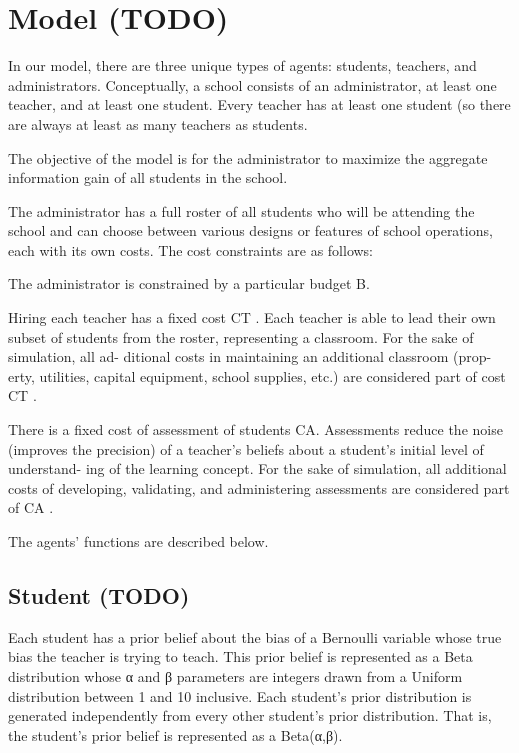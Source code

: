 \documentclass[10pt, letterpaper]{article}
\begin{document}
\section{Model (TODO)}\label{model-todo}

In our model, there are three unique types of agents: students,
teachers, and administrators. Conceptually, a school consists of an
administrator, at least one teacher, and at least one student. Every
teacher has at least one student (so there are always at least as many
teachers as students.

The objective of the model is for the administrator to maximize the
aggregate information gain of all students in the school.

The administrator has a full roster of all students who will be
attending the school and can choose between various designs or features
of school operations, each with its own costs. The cost constraints are
as follows:

The administrator is constrained by a particular budget B.

Hiring each teacher has a fixed cost CT . Each teacher is able to lead
their own subset of students from the roster, representing a classroom.
For the sake of simulation, all ad- ditional costs in maintaining an
additional classroom (prop- erty, utilities, capital equipment, school
supplies, etc.) are considered part of cost CT .

There is a fixed cost of assessment of students CA. Assessments reduce
the noise (improves the precision) of a teacher's beliefs about a
student's initial level of understand- ing of the learning concept. For
the sake of simulation, all additional costs of developing, validating,
and administering assessments are considered part of CA .

The agents' functions are described below.

\subsection{Student (TODO)}\label{student-todo}

Each student has a prior belief about the bias of a Bernoulli variable
whose true bias the teacher is trying to teach. This prior belief is
represented as a Beta distribution whose α and β parameters are integers
drawn from a Uniform distribution between 1 and 10 inclusive. Each
student's prior distribution is generated independently from every other
student's prior distribution. That is, the student's prior belief is
represented as a Beta(α,β).
\end{document}
